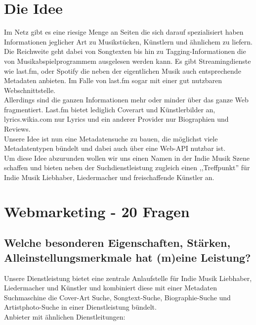 \documentclass[11pt]{scrreprt}
\begin{document}
\maketitle
\tableofcontents


\chapter{Die Idee}
Im Netz gibt es eine riesige Menge an Seiten die sich darauf spezialisiert
haben Informationen jeglicher Art zu Musikstücken, Künstlern und ähnlichem zu
liefern.
\\
Die Reichweite geht dabei von Songtexten bis hin zu Tagging-Informationen die von
Musikabspielprogrammem ausgelesen werden kann. Es gibt Streamingdienste wie last.fm,
oder Spotify die neben der eigentlichen Musik auch entsprechende Metadaten anbieten. 
Im Falle von last.fm sogar mit einer gut nutzbaren Webschnittstelle.
\\
Allerdings sind die ganzen Informationen mehr oder minder über das ganze Web
fragmentiert. Last.fm bietet lediglich Coverart und Künstlerbilder an, 
lyrics.wikia.com nur Lyrics und ein anderer Provider nur Biographien und
Reviews.
\\
Unsere Idee ist nun eine Metadatensuche zu bauen, die möglichst viele
Metadatentypen bündelt und dabei auch über eine Web-API nutzbar ist.
\\
Um diese Idee abzurunden wollen wir uns einen Namen in der Indie Musik Szene
schaffen und bieten neben der Suchdienstleistung zugleich einen ,,Treffpunkt'' für Indie
Musik Liebhaber, Liedermacher und freischaffende Künstler an.


\chapter{Webmarketing - 20 Fragen}
\label{wettbewerb}\section{Welche besonderen Eigenschaften, Stärken,
Alleinstellungsmerkmale hat (m)eine Leistung?}

Unsere Dienstleistung bietet eine zentrale Anlaufstelle für Indie Musik
Liebhaber, Liedermacher und Künstler und kombiniert diese mit einer Metadaten Suchmaschine
die Cover-Art Suche, Songtext-Suche, Biographie-Suche und Artistphoto-Suche in
einer Dienstleistung bündelt.
\\
Anbieter mit ähnlichen Dienstleitungen: \\
\end{document}
